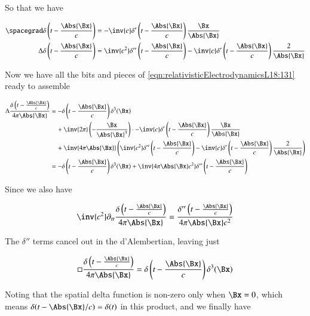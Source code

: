 So that we have

\begin{align}\label{eqn:relativisticElectrodynamicsL18:440}
\spacegrad \delta\left(t - \frac{\Abs{\Bx}}{c}\right) &= 
-\inv{c} \delta'\left(t - \frac{\Abs{\Bx}}{c}\right) \frac{\Bx}{\Abs{\Bx}} \\
\Delta \delta\left(t - \frac{\Abs{\Bx}}{c}\right) &=
\inv{c^2} \delta''\left(t - \frac{\Abs{\Bx}}{c}\right) -\inv{c} \delta'\left(t - \frac{\Abs{\Bx}}{c}\right) \frac{2}{\Abs{\Bx}} 
\end{align}

Now we have all the bits and pieces of \ref{eqn:relativisticElectrodynamicsL18:131} ready to assemble

\begin{align*}
\Delta \frac{\delta\left(t - \frac{\Abs{\Bx}}{c}\right)}{4 \pi \Abs{\Bx} }
&=
-\delta\left(t - \frac{\Abs{\Bx}}{c}\right) \delta^3(\Bx) \\
&\quad +\inv{2\pi} \left( - \frac{\Bx}{\Abs{\Bx}^3} \right)
\cdot
-\inv{c} \delta'\left(t - \frac{\Abs{\Bx}}{c}\right) \frac{\Bx}{\Abs{\Bx}} \\
&\quad +
\inv{4 \pi \Abs{\Bx} }
\left(
\inv{c^2} \delta''\left(t - \frac{\Abs{\Bx}}{c}\right) -\inv{c} \delta'\left(t - \frac{\Abs{\Bx}}{c}\right) \frac{2}{\Abs{\Bx}} \right) \\
&=
-\delta\left(t - \frac{\Abs{\Bx}}{c}\right) \delta^3(\Bx) 
+\inv{4 \pi \Abs{\Bx} c^2 }
\delta''\left(t - \frac{\Abs{\Bx}}{c}\right) 
\end{align*}

Since we also have

\begin{equation}\label{eqn:relativisticElectrodynamicsL18:500}
\inv{c^2} \partial_{tt}
\frac{\delta\left(t - \frac{\Abs{\Bx}}{c}\right)}{4 \pi \Abs{\Bx} }
=
\frac{\delta''\left(t - \frac{\Abs{\Bx}}{c}\right)}{4 \pi \Abs{\Bx} c^2}
\end{equation}

The $\delta''$ terms cancel out in the d'Alembertian, leaving just

\begin{equation}\label{eqn:relativisticElectrodynamicsL18:460}
\square \frac{\delta\left(t - \frac{\Abs{\Bx}}{c}\right)}{4 \pi \Abs{\Bx} }
=
\delta\left(t - \frac{\Abs{\Bx}}{c}\right) \delta^3(\Bx) 
\end{equation}

Noting that the spatial delta function is non-zero only when $\Bx = 0$, which means $\delta(t - \Abs{\Bx}/c) = \delta(t)$ in this product, and we finally have

